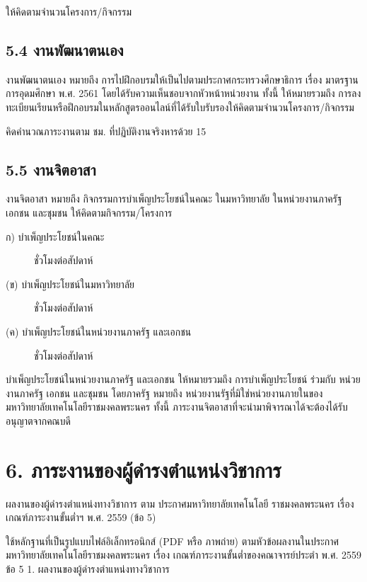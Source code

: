 \documentclass[a4paper,12pt,english]{sphinxmanual}
\begin{document}
ให้คิดตามจำนวนโครงการ/กิจกรรม


\section{5.4 งานพัฒนาตนเอง}
\label{\detokenize{5etc:id10}}
งานพัฒนาตนเอง หมายถึง การไปฝึกอบรมให้เป็นไปตามประกาศกระทรวงศึกษาธิการ เรื่อง มาตรฐานการอุดมศึกษา พ.ศ. 2561 โดยได้รับความเห็นชอบจากหัวหน้าหน่วยงาน ทั้งนี้ ให้หมายรวมถึง การลงทะเบียนเรียนหรือฝึกอบรมในหลักสูตรออนไลน์ที่ได้รับใบรับรองให้คิดตามจำนวนโครงการ/กิจกรรม

คิดคำนวณภาระงานตาม ชม. ที่ปฏิบัติงานจริงหารด้วย 15


\section{5.5 งานจิตอาสา}
\label{\detokenize{5etc:id11}}
งานจิตอาสา หมายถึง กิจกรรมการบำเพ็ญประโยชน์ในคณะ ในมหาวิทยาลัย ในหน่วยงานภาครัฐ เอกชน และชุมชน
ให้คิดตามกิจกรรม/โครงการ
\begin{description}
\item[{ก) บำเพ็ญประโยชน์ในคณะ}]  ชั่วโมงต่อสัปดาห์

\item[{(ข) บำเพ็ญประโยชน์ในมหาวิทยาลัย}]  ชั่วโมงต่อสัปดาห์

\item[{(ค) บำเพ็ญประโยชน์ในหน่วยงานภาครัฐ และเอกชน}]  ชั่วโมงต่อสัปดาห์

\end{description}

บำเพ็ญประโยชน์ในหน่วยงานภาครัฐ และเอกชน ให้หมายรวมถึง การบำเพ็ญประโยชน์ ร่วมกับ หน่วยงานภาครัฐ เอกชน และชุมชน โดยภาครัฐ หมายถึง หน่วยงานรัฐที่มิใช่หน่วยงานภายในของมหาวิทยาลัยเทคโนโลยีราชมงคลพระนคร ทั้งนี้ ภาระงานจิตอาสาที่จะนำมาพิจารณาได้จะต้องได้รับอนุญาตจากคณบดี


\chapter{6. ภาระงานของผู้ดำรงตำแหน่งวิชาการ}
\label{\detokenize{6academicposition:id1}}\label{\detokenize{6academicposition::doc}}
ผลงานของผู้ดำรงตำแหน่งทางวิชาการ ตาม ประกาศมหาวิทยาลัยเทคโนโลยี
ราชมงคลพระนคร เรื่อง เกณฑ์ภาระงานขั้นต่ำฯ พ.ศ. 2559 (ข้อ 5)

ใช้หลักฐานที่เป็นรูปแบบไฟล์อิเล็กทรอนิกส์ (PDF หรือ ภาพถ่าย) ตามหัวข้อผลงานในประกาศมหาวิทยาลัยเทคโนโลยีราชมงคลพระนคร เรื่อง เกณฑ์ภาระงานขั้นต่ำของคณาจารย์ประตำ พ.ศ. 2559 ข้อ 5 1. ผลงานของผู้ดำรงตำแหน่งทางวิชาการ
\end{document}
